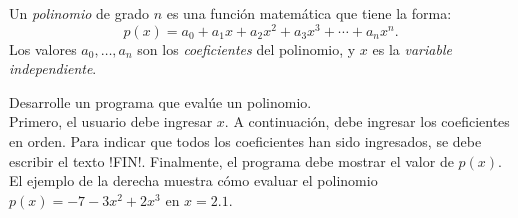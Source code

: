 Un \emph{polinomio} de grado \(n\)
es una función matemática que tiene la forma:
\[
  p(x) =
  a_0     +
  a_1 x   +
  a_2 x^2 +
  a_3 x^3 +
  \cdots +
  a_n x^n.
\]
Los valores \(a_0, \ldots, a_n\)
son los \emph{coeficientes} del polinomio,
y \(x\) es la \emph{variable independiente}.

\begin{minipage}[t]{.63\textwidth}
  Desarrolle un programa
  que evalúe un polinomio.
  \\[1ex]
  Primero,
  el usuario debe ingresar \(x\).
  A continuación,
  debe ingresar los coeficientes en orden.
  Para indicar que todos los coeficientes han sido ingresados,
  se debe escribir el texto \li!FIN!.
  Finalmente,
  el programa debe mostrar
  el valor de \(p(x)\).
  \\[1ex]
  El ejemplo de la derecha
  muestra cómo evaluar el polinomio
  \(p(x) = -7 - 3x^2 + 2x^3\) en \(x = 2.1\).
\end{minipage}
\hfill
\begin{minipage}[t]{.26\textwidth}
  
\end{minipage}


